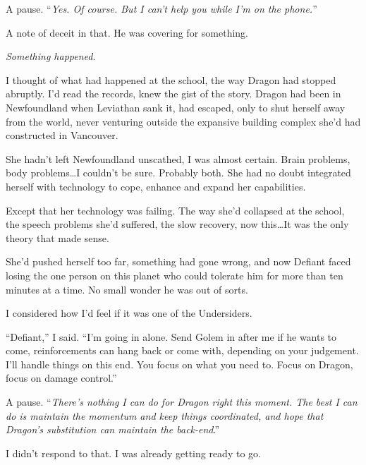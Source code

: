 A pause.  ``\emph{Yes.  Of course.  But I can't help you while I'm on the phone.}''



A note of deceit in that.  He was covering for something.



\emph{Something happened}.



I thought of what had happened at the school, the way Dragon had stopped abruptly.  I'd read the records, knew the gist of the story.  Dragon had been in Newfoundland when Leviathan sank it, had escaped, only to shut herself away from the world, never venturing outside the expansive building complex she'd had constructed in Vancouver.



She hadn't left Newfoundland unscathed, I was almost certain.  Brain problems, body problems\ldots I couldn't be sure.  Probably both.  She had no doubt integrated herself with technology to cope, enhance and expand her capabilities.



Except that her technology was failing.  The way she'd collapsed at the school, the speech problems she'd suffered, the slow recovery, now this\ldots  It was the only theory that made sense.



She'd pushed herself too far, something had gone wrong, and now Defiant faced losing the one person on this planet who could tolerate him for more than ten minutes at a time.  No small wonder he was out of sorts.



I considered how I'd feel if it was one of the Undersiders.



``Defiant,'' I said.  ``I'm going in alone.  Send Golem in after me if he wants to come, reinforcements can hang back or come with, depending on your judgement.  I'll handle things on this end.  You focus on what you need to.  Focus on Dragon, focus on damage control.''



A pause.  ``\emph{There's nothing I can do for Dragon right this moment.  The best I can do is maintain the momentum and keep things coordinated, and hope that Dragon's substitution can maintain the back-end}.''



I didn't respond to that.  I was already getting ready to go.



